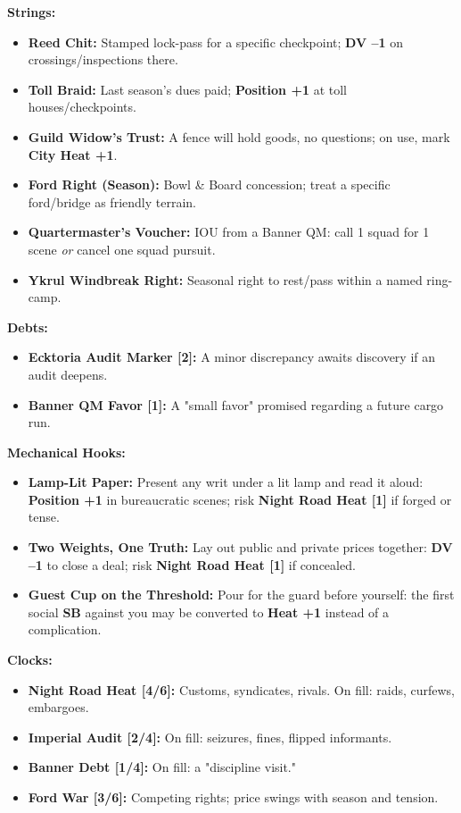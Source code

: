\textbf{Strings:}
\begin{itemize}
    \item \textbf{Reed Chit:} Stamped lock-pass for a specific checkpoint; \textbf{DV --1} on crossings/inspections there.
    \item \textbf{Toll Braid:} Last season's dues paid; \textbf{Position +1} at toll houses/checkpoints.
    \item \textbf{Guild Widow's Trust:} A fence will hold goods, no questions; on use, mark \textbf{City Heat +1}.
    \item \textbf{Ford Right (Season):} Bowl \& Board concession; treat a specific ford/bridge as friendly terrain.
    \item \textbf{Quartermaster's Voucher:} IOU from a Banner QM: call 1 squad for 1 scene \emph{or} cancel one squad pursuit.
    \item \textbf{Ykrul Windbreak Right:} Seasonal right to rest/pass within a named ring-camp.
\end{itemize}

\textbf{Debts:}
\begin{itemize}
    \item \textbf{Ecktoria Audit Marker [2]:} A minor discrepancy awaits discovery if an audit deepens.
    \item \textbf{Banner QM Favor [1]:} A "small favor" promised regarding a future cargo run.
\end{itemize}

\textbf{Mechanical Hooks:}
\begin{itemize}
    \item \textbf{Lamp-Lit Paper:} Present any writ under a lit lamp and read it aloud: \textbf{Position +1} in bureaucratic scenes; risk \textbf{Night Road Heat [1]} if forged or tense.
    \item \textbf{Two Weights, One Truth:} Lay out public and private prices together: \textbf{DV --1} to close a deal; risk \textbf{Night Road Heat [1]} if concealed.
    \item \textbf{Guest Cup on the Threshold:} Pour for the guard before yourself: the first social \textbf{SB} against you may be converted to \textbf{Heat +1} instead of a complication.
\end{itemize}

\textbf{Clocks:}
\begin{itemize}
    \item \textbf{Night Road Heat [4/6]:} Customs, syndicates, rivals. On fill: raids, curfews, embargoes.
    \item \textbf{Imperial Audit [2/4]:} On fill: seizures, fines, flipped informants.
    \item \textbf{Banner Debt [1/4]:} On fill: a "discipline visit."
    \item \textbf{Ford War [3/6]:} Competing rights; price swings with season and tension.
\end{itemize}

